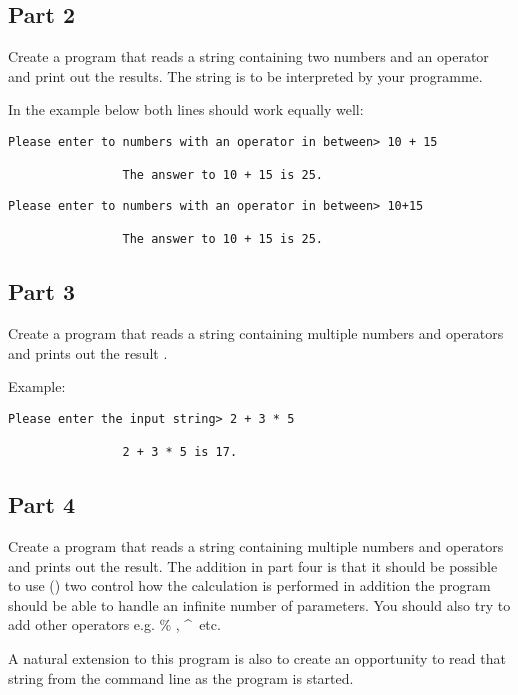 \documentclass{article}
\begin{document}
		\subsection{Part 2}
			Create a program that reads a string containing two numbers and an operator and print out the results. The string is to be interpreted by your programme. 
			
			In the example below both lines should work equally well:
			
			\begin{lstlisting}[numbers=none]
				Please enter to numbers with an operator in between> 10 + 15
				
				The answer to 10 + 15 is 25.
			\end{lstlisting}

			

			\begin{lstlisting}[numbers=none]
				Please enter to numbers with an operator in between> 10+15
				
				The answer to 10 + 15 is 25.
			\end{lstlisting}
			
		\subsection{Part 3}
			Create a program that reads a string containing multiple numbers and operators and prints out the result .
			
			Example:
			\begin{lstlisting}[numbers=none]
				Please enter the input string> 2 + 3 * 5
				
				2 + 3 * 5 is 17.
			\end{lstlisting}
		\subsection{Part 4}
			Create a program that reads a string containing multiple numbers and operators and prints out the result. The addition in part four is that it should be possible to use () two control how the calculation is performed in addition the program should be able to handle an infinite number of parameters. You should also try to add other operators e.g.  \% , \^~etc. \cite{UML2}
			
			A natural extension to this program is also to create an opportunity to read that string from the command line as the program is started. ~\cite{cpplang4}
			
\end{document}
